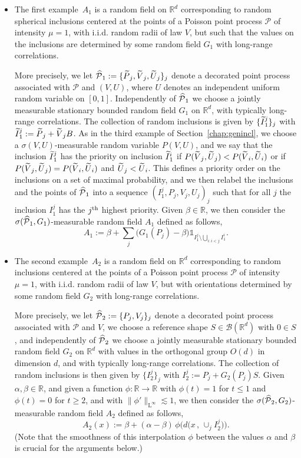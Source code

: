 \documentclass[10pt]{amsart}
\theoremstyle{definition}\newtheorem{defi}[theo]{Definition}\newtheorem{rema}[theo]{Remark}\newtheorem{exam}[theo]{Example}\newtheorem{exem}[theo]{Example}\newtheorem{nota}[theo]{Notation}
\newcommand{\R}{\mathbb R}
\newcommand{\B}{\mathcal B}
\newcommand{\Pc}{\mathcal P}
\DeclareMathOperator{\Ld}{L}
\let\oldtilde\tilde
\renewcommand*{\tilde}[1]{\mathchoice{\widetilde{#1}}{\widetilde{#1}}{\oldtilde{#1}}{\oldtilde{#1}}}\let\oldhat\hat
\renewcommand*{\hat}[1]{\mathchoice{\widehat{#1}}{\widehat{#1}}{\oldhat{#1}}{\oldhat{#1}}}\let\oldexists\exists
\renewcommand*{\exists}{\mathrel{\oldexists}}
\begin{document}
\begin{itemize}
\item The first example~$A_1$ is a random field on $\R^d$ corresponding to random spherical inclusions centered at the points of a Poisson point process $\Pc$ of intensity $\mu=1$, with i.i.d. random radii of law $V$, but such that the values on the inclusions are determined by some random field $G_1$ with long-range correlations.

More precisely, we let $\hat\Pc_1:=\{\tilde P_j,\tilde V_j,\tilde U_j\}_j$ denote a decorated point process associated with $\Pc$ and $(V,U)$, where $U$ denotes an independent uniform random variable on $[0,1]$. Independently of $\hat\Pc_1$ we choose a jointly measurable stationary bounded random field $G_1$ on $\R^d$, with typically long-range correlations. The collection of random inclusions is given by $\{\tilde I_1^j\}_j$ with $\tilde I_1^j:=\tilde P_j+\tilde V_jB$. As in the third example of Section~\ref{chap:genincl}, we choose a $\sigma(V,U)$-measurable random variable $P(V,U)$, and we say that the inclusion $\tilde I_1^j$ has the priority on inclusion $\tilde I_1^i$ if $P(\tilde V_j,\tilde U_j)<P(\tilde V_i,\tilde U_i)$ or if $P(\tilde V_j,\tilde U_j)=P(\tilde V_i,\tilde U_i)$ and $\tilde U_j<\tilde U_i$. This defines a priority order on the inclusions on a set of maximal probability, and we then relabel the inclusions and the points of $\hat\Pc_1$ into a sequence $(I_1^j, P_j,V_j,U_j)_j$ such that for all $j$ the inclusion $I_1^j$ has the $j^{\rm th}$ highest priority. Given $\beta\in\R$, we then consider the $\sigma(\hat\Pc_1,G_1)$-measurable random field $A_1$ defined as follows,
\[
A_1:=\beta+\sum_j\big(G_1(P_j)-\beta\big)\mathds1_{I_1^j\setminus\bigcup_{i:i<j}I_1^i}.
\]
\item The second example~$A_2$ is a random field on $\R^d$ corresponding to random inclusions centered at the points of a Poisson point process $\Pc$ of intensity $\mu=1$, with i.i.d. random radii of law $V$, but with orientations determined by some random field $G_2$ with long-range correlations.

More precisely, we let $\hat\Pc_2:=\{P_j,V_j\}_j$ denote a decorated point process associated with $\Pc$ and $V$, we choose a reference shape $S\in\B(\R^d)$ with $0\in S$, and independently of $\hat\Pc_2$ we choose a jointly measurable stationary bounded random field $G_2$ on $\R^d$ with values in the orthogonal group $O(d)$ in dimension $d$, and with typically long-range correlations. The collection of random inclusions is then given by $\{I_2^j\}_j$ with $I_2^j:=P_j+G_2(P_j) S$. Given $\alpha,\beta\in\R$, and given a function $\phi:\R\to\R$ with $\phi(t)=1$ for $t\le1$ and $\phi(t)=0$ for $t\ge2$, and with $\|\phi'\|_{\Ld^\infty}\lesssim1$, we then consider the $\sigma(\hat\Pc_2,G_2)$-measurable random field $A_2$ defined as follows,
\[
A_2(x):=\beta+(\alpha-\beta)\,\phi\Big(d\big(x\,,\,\cup_jI_2^j\big)\Big).
\]
(Note that the smoothness of this interpolation $\phi$ between the values $\alpha$ and $\beta$ is crucial for the arguments below.)


\end{itemize}
\end{document}
